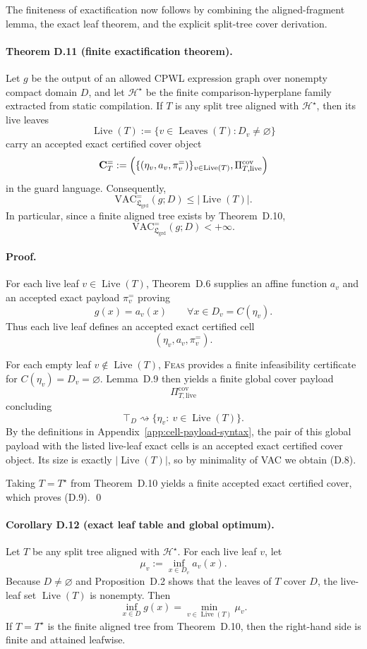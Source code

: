 The finiteness of exactification now follows by combining the aligned-fragment lemma, the exact leaf theorem, and the explicit split-tree cover derivation.

\paragraph{Theorem D.11 (finite exactification theorem).}
Let $g$ be the output of an allowed CPWL expression graph over nonempty compact domain $D$, and let $\mathcal H^\star$ be the finite comparison-hyperplane family extracted from static compilation. If $T$ is any split tree aligned with $\mathcal H^\star$, then its live leaves
\[
 \operatorname{Live}(T):=\{v\in \operatorname{Leaves}(T): D_v\neq\varnothing\}
\]
carry an accepted exact certified cover object
\[
 \mathbf C_T^{=}
 :=
 \Bigl(
 \{(\eta_v,a_v,\pi_v^{=})\}_{v\in \operatorname{Live}(T)},
 \Pi_{T,\mathrm{live}}^{\mathrm{cov}}
 \Bigr)
\]
in the guard language. Consequently,
\[
 \mathrm{VAC}^{=}_{\mathfrak L_{\mathrm{grd}}}(g;D)
 \le
 |\operatorname{Live}(T)|.
\tag{D.8}
\]
In particular, since a finite aligned tree exists by Theorem~D.10,
\[
 \mathrm{VAC}^{=}_{\mathfrak L_{\mathrm{grd}}}(g;D)<+\infty.
\tag{D.9}
\]

\paragraph{Proof.}
For each live leaf $v\in \operatorname{Live}(T)$, Theorem~D.6 supplies an affine function $a_v$ and an accepted exact payload $\pi_v^{=}$ proving
\[
 g(x)=a_v(x)
 \qquad \forall x\in D_v=C(\eta_v).
\]
Thus each live leaf defines an accepted exact certified cell
\[
 (\eta_v,a_v,\pi_v^{=}).
\]

For each empty leaf $v\notin \operatorname{Live}(T)$, \textsc{Feas} provides a finite infeasibility certificate for $C(\eta_v)=D_v=\varnothing$. Lemma~D.9 then yields a finite global cover payload
\[
 \Pi_{T,\mathrm{live}}^{\mathrm{cov}}
\]
concluding
\[
 \top_D\rightsquigarrow \{\eta_v:\ v\in \operatorname{Live}(T)\}.
\]
By the definitions in Appendix~\ref{app:cell-payload-syntax}, the pair of this global payload with the listed live-leaf exact cells is an accepted exact certified cover object. Its size is exactly $|\operatorname{Live}(T)|$, so by minimality of VAC we obtain (D.8).

Taking $T=T^\star$ from Theorem~D.10 yields a finite accepted exact certified cover, which proves (D.9). \qed

\paragraph{Corollary D.12 (exact leaf table and global optimum).}
Let $T$ be any split tree aligned with $\mathcal H^\star$. For each live leaf $v$, let
\[
 \mu_v:=\inf_{x\in D_v} a_v(x).
\]
Because $D\neq\varnothing$ and Proposition~D.2 shows that the leaves of $T$ cover $D$, the live-leaf set $\operatorname{Live}(T)$ is nonempty. Then
\[
 \inf_{x\in D}g(x)
 =
 \min_{v\in \operatorname{Live}(T)} \mu_v.
\tag{D.10}
\]
If $T=T^\star$ is the finite aligned tree from Theorem~D.10, then the right-hand side is finite and attained leafwise.

